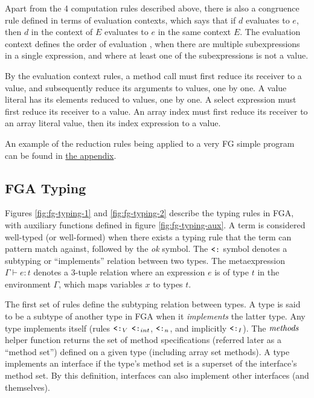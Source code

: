 Apart from the 4 computation rules described above, there is also a congruence
rule defined in terms of evaluation contexts, which says that if $d$ evaluates
to $e$, then $d$ in the context of $E$ evaluates to $e$ in the same context $E$.
The evaluation context defines the order of evaluation \autocite{evalContexts},
when there are multiple subexpressions in a single expression, and where at
least one of the subexpressions is not a value.

By the evaluation context rules, a method call must first reduce its receiver to
a value, and subsequently reduce its arguments to values, one by one. A value
literal has its elements reduced to values, one by one. A select expression must
first reduce its receiver to a value. An array index must first reduce its
receiver to an array literal value, then its index expression to a value.

An example of the reduction rules being applied to a very FG simple program can
be found in \hyperref[sec:fg-derivation-example]{the appendix}.




\subsection{FGA Typing}

Figures \ref{fig:fg-typing-1} and \ref{fig:fg-typing-2} describe the typing
rules in FGA, with auxiliary functions defined in figure
\ref{fig:fg-typing-aux}. A term is considered well-typed (or well-formed) when
there exists a typing rule that the term can pattern match against, followed by
the \emph{ok} symbol. The $\mathbin{\texttt{<:}}$ symbol denotes a subtyping or ``implements''
relation between two types. The metaexpression $\Gamma \vdash e : t$ denotes a
3-tuple relation where an expression $e$ is of type $t$ in the environment
$\Gamma$, which maps variables $x$ to types $t$.

The first set of rules define the subtyping relation between types. A type is
said to be a subtype of another type in FGA when it \emph{implements} the latter
type. Any type implements itself (rules $\mathbin{\texttt{<:}}_V$ $\mathbin{\texttt{<:}}_{int}$, $\mathbin{\texttt{<:}}_n$, and
implicitly $\mathbin{\texttt{<:}}_I$). The $\mathit{methods}$ helper function returns the set of method
specifications (referred later as a ``method set'') defined on a given type
(including array set methods). A type implements an interface if the type's
method set is a superset of the interface's method set. By this definition,
interfaces can also implement other interfaces (and themselves).

